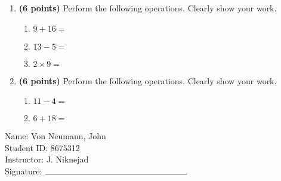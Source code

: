 \documentclass[12pt]{amsart}
\begin{document}
\newpage
\begin{enumerate}
\item {\bf (6 points)} 
 Perform the following operations. Clearly show your work. \begin{enumerate}


\def \a{9}\def \b{16}\def \apb{25}

 
\item $\a + \b = $

\vspace{2cm}
\def \a{13}\def \dif{8}\def \b{5}

 
\item $\a - \b = $

\vspace{2cm}
\def \a{2}\def \b{9}\def \ab{11}

 
\item $\a \times \b = $ 

\vspace{2cm}
\def \vshift{-3}\def \hshift{4}\def \chang{1}\def \findval{5}\def \yval{-5}

 
\end{enumerate}


\newpage
\item {\bf (6 points)} 
 Perform the following operations. Clearly show your work. \begin{enumerate}


\def \a{11}\def \dif{7}\def \b{4}

 
\item $\a - \b = $

\vspace{2cm}
\def \a{6}\def \b{18}\def \apb{24}

 
\item $\a + \b = $

\vspace{2cm}
\def \vshift{-1}\def \hshift{0}\def \chang{2}\def \findval{2}\def \yval{-5}

 
\end{enumerate}


\newpage\end{enumerate}\graphicspath{{/Users/jilan/Downloads/Randomizer/Randomizer/Sample Course/Sample Assessment 2/}}\setcounter{page}{1}


\thispagestyle{fancy}

 \noindent Name: Von Neumann, John \vspace{.3cm} \\\noindent Student ID: 8675312 \vspace{.3cm} \\\noindent Instructor: J. Niknejad \vspace{.3cm} \\\noindent Signature: $\rule{6cm}{0.15mm}$ \vspace{.3cm} \\ 
\end{document}
